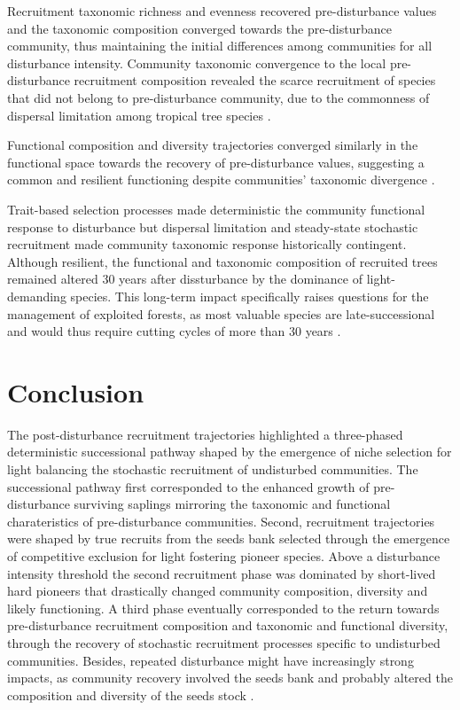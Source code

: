\documentclass[fleqn,10pt]{ArtEcoFoG} %
\begin{document}
Recruitment taxonomic richness and evenness recovered pre-disturbance
values and the taxonomic composition converged towards the
pre-disturbance community, thus maintaining the initial differences
among communities for all disturbance intensity. Community taxonomic
convergence to the local pre-disturbance recruitment composition
revealed the scarce recruitment of species that did not belong to
pre-disturbance community, due to the commonness of dispersal limitation
among tropical tree species \citep{Svenning2005}.

Functional composition and diversity trajectories converged similarly in
the functional space towards the recovery of pre-disturbance values,
suggesting a common and resilient functioning despite communities'
taxonomic divergence \citep{Fukami2005}.

Trait-based selection processes made deterministic the community
functional response to disturbance but dispersal limitation and
steady-state stochastic recruitment made community taxonomic response
historically contingent. Although resilient, the functional and
taxonomic composition of recruited trees remained altered 30 years after
dissturbance by the dominance of light-demanding species. This long-term
impact specifically raises questions for the management of exploited
forests, as most valuable species are late-successional and would thus
require cutting cycles of more than 30 years \citep{Putz2012}.

\section{Conclusion}\label{conclusion}

The post-disturbance recruitment trajectories highlighted a three-phased
deterministic successional pathway shaped by the emergence of niche
selection for light balancing the stochastic recruitment of undisturbed
communities. The successional pathway first corresponded to the enhanced
growth of pre-disturbance surviving saplings mirroring the taxonomic and
functional charateristics of pre-disturbance communities. Second,
recruitment trajectories were shaped by true recruits from the seeds
bank selected through the emergence of competitive exclusion for light
fostering pioneer species. Above a disturbance intensity threshold the
second recruitment phase was dominated by short-lived hard pioneers that
drastically changed community composition, diversity and likely
functioning. A third phase eventually corresponded to the return towards
pre-disturbance recruitment composition and taxonomic and functional
diversity, through the recovery of stochastic recruitment processes
specific to undisturbed communities. Besides, repeated disturbance might
have increasingly strong impacts, as community recovery involved the
seeds bank and probably altered the composition and diversity of the
seeds stock \citep{Norden2009}.
\end{document}
